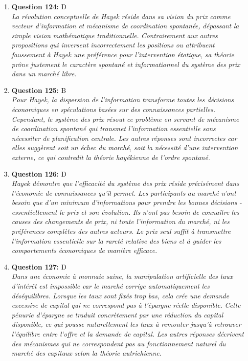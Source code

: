 \documentclass[12pt,a4paper]{article}
\begin{document}
\begin{enumerate}
\item \textbf{Question 124:} D
\\ \textit{La révolution conceptuelle de Hayek réside dans sa vision du prix comme vecteur d'information et mécanisme de coordination spontanée, dépassant la simple vision mathématique traditionnelle. Contrairement aux autres propositions qui inversent incorrectement les positions ou attribuent faussement à Hayek une préférence pour l'intervention étatique, sa théorie prône justement le caractère spontané et informationnel du système des prix dans un marché libre.}

\item \textbf{Question 125:} B
\\ \textit{Pour Hayek, la dispersion de l'information transforme toutes les décisions économiques en spéculations basées sur des connaissances partielles. Cependant, le système des prix résout ce problème en servant de mécanisme de coordination spontané qui transmet l'information essentielle sans nécessiter de planification centrale. Les autres réponses sont incorrectes car elles suggèrent soit un échec du marché, soit la nécessité d'une intervention externe, ce qui contredit la théorie hayékienne de l'ordre spontané.}

\item \textbf{Question 126:} D
\\ \textit{Hayek démontre que l'efficacité du système des prix réside précisément dans l'économie de connaissances qu'il permet. Les participants au marché n'ont besoin que d'un minimum d'informations pour prendre les bonnes décisions - essentiellement le prix et son évolution. Ils n'ont pas besoin de connaître les causes des changements de prix, ni toute l'information du marché, ni les préférences complètes des autres acteurs. Le prix seul suffit à transmettre l'information essentielle sur la rareté relative des biens et à guider les comportements économiques de manière efficace.}

\item \textbf{Question 127:} D
\\ \textit{Dans une économie à monnaie saine, la manipulation artificielle des taux d'intérêt est impossible car le marché corrige automatiquement les déséquilibres. Lorsque les taux sont fixés trop bas, cela crée une demande excessive de capital qui ne correspond pas à l'épargne réelle disponible. Cette pénurie d'épargne se traduit concrètement par une réduction du capital disponible, ce qui pousse naturellement les taux à remonter jusqu'à retrouver l'équilibre entre l'offre et la demande de capital. Les autres réponses décrivent des mécanismes qui ne correspondent pas au fonctionnement naturel du marché des capitaux selon la théorie autrichienne.}


\end{enumerate}
\end{document}
